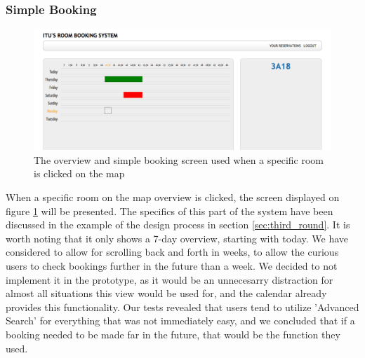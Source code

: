 \subsubsection*{Simple Booking}
\begin{figure}[htb]
\begin{center}
\leavevmode
\includegraphics[width=1\textwidth]{images/simple_booking}
\end{center}
\caption{The overview and simple booking screen used when a specific room is clicked on the map}
\label{fig:simple_booking}
\end{figure}
When a specific room on the map overview is clicked, the screen displayed on figure \ref{fig:simple_booking} will be presented. The specifics of this part of the system have been discussed in the example of the design process in section \ref{sec:third_round}.
It is worth noting that it only shows a 7-day overview, starting with today. We have considered to allow for scrolling back and forth in weeks, to allow the curious users to check bookings further in the future than a week.
We decided to not implement it in the prototype, as it would be an unnecesarry distraction for almost all situations this view would be used for, and the calendar already provides this functionality.
Our tests revealed that users tend to utilize 'Advanced Search' for everything that was not immediately easy, and we concluded that if a booking needed to be made far in the future, that would be the function they used.

\pagebreak

